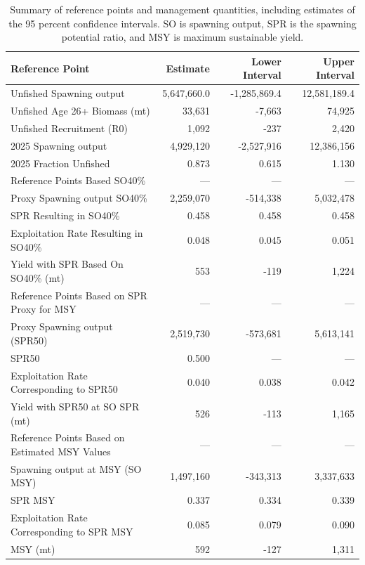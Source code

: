 \documentclass[
]{scrartcl}
\begin{document}
\begin{longtable}{lrrr}

\caption{\label{tbl-ref-points-es}Summary of reference points and
management quantities, including estimates of the 95 percent confidence
intervals. SO is spawning output, SPR is the spawning potential ratio,
and MSY is maximum sustainable yield.}

\tabularnewline

\toprule
Reference Point & Estimate & Lower Interval & Upper Interval \\ 
\midrule\addlinespace[2.5pt]
Unfished Spawning output & 5,647,660.0 & -1,285,869.4 & 12,581,189.4 \\ 
Unfished Age 26+ Biomass (mt) & 33,631 & -7,663 & 74,925 \\ 
Unfished Recruitment (R0) & 1,092 & -237 & 2,420 \\ 
2025 Spawning output & 4,929,120 & -2,527,916 & 12,386,156 \\ 
2025 Fraction Unfished & 0.873 & 0.615 & 1.130 \\ 
Reference Points Based SO40\% & — & — & — \\ 
Proxy Spawning output SO40\% & 2,259,070 & -514,338 & 5,032,478 \\ 
SPR Resulting in SO40\% & 0.458 & 0.458 & 0.458 \\ 
Exploitation Rate Resulting in SO40\% & 0.048 & 0.045 & 0.051 \\ 
Yield with SPR Based On SO40\% (mt) & 553 & -119 & 1,224 \\ 
Reference Points Based on SPR Proxy for MSY & — & — & — \\ 
Proxy Spawning output (SPR50) & 2,519,730 & -573,681 & 5,613,141 \\ 
SPR50 & 0.500 & — & — \\ 
Exploitation Rate Corresponding to SPR50 & 0.040 & 0.038 & 0.042 \\ 
Yield with SPR50 at SO SPR (mt) & 526 & -113 & 1,165 \\ 
Reference Points Based on Estimated MSY Values & — & — & — \\ 
Spawning output at MSY (SO MSY) & 1,497,160 & -343,313 & 3,337,633 \\ 
SPR MSY & 0.337 & 0.334 & 0.339 \\ 
Exploitation Rate Corresponding to SPR MSY & 0.085 & 0.079 & 0.090 \\ 
MSY (mt) & 592 & -127 & 1,311 \\ 
\bottomrule

\end{longtable}
\end{document}
